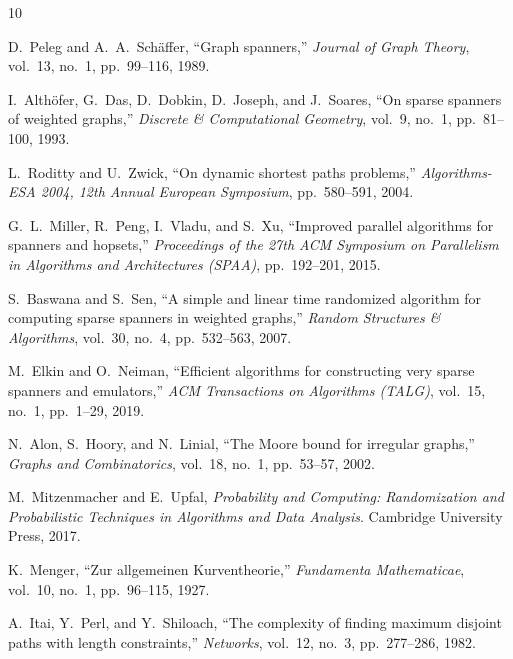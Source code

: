 \documentclass[11pt,a4paper]{report}
\theoremstyle{plain}
\theoremstyle{definition}
\theoremstyle{remark}
\begin{document}
\begin{thebibliography}{10}
\baselineskip=6mm
\begin{LTRbibitems}
\resetlatinfont

D.~Peleg and A.~A.~Schäffer, ``Graph spanners,'' \emph{Journal of Graph Theory}, vol.~13, no.~1, pp.~99--116, 1989.

I.~Althöfer, G.~Das, D.~Dobkin, D.~Joseph, and J.~Soares, ``On sparse spanners of weighted graphs,'' \emph{Discrete \& Computational Geometry}, vol.~9, no.~1, pp.~81--100, 1993.

L.~Roditty and U.~Zwick, ``On dynamic shortest paths problems,'' \emph{Algorithms-ESA 2004, 12th Annual European Symposium}, pp.~580--591, 2004.

G.~L.~Miller, R.~Peng, I.~Vladu, and S.~Xu, ``Improved parallel algorithms for spanners and hopsets,'' \emph{Proceedings of the 27th ACM Symposium on Parallelism in Algorithms and Architectures (SPAA)}, pp.~192--201, 2015.

S.~Baswana and S.~Sen, ``A simple and linear time randomized algorithm for computing sparse spanners in weighted graphs,'' \emph{Random Structures \& Algorithms}, vol.~30, no.~4, pp.~532--563, 2007.

M.~Elkin and O.~Neiman, ``Efficient algorithms for constructing very sparse spanners and emulators,'' \emph{ACM Transactions on Algorithms (TALG)}, vol.~15, no.~1, pp.~1--29, 2019.

N.~Alon, S.~Hoory, and N.~Linial, ``The Moore bound for irregular graphs,'' \emph{Graphs and Combinatorics}, vol.~18, no.~1, pp.~53--57, 2002.

M.~Mitzenmacher and E.~Upfal, \emph{Probability and Computing: Randomization and Probabilistic Techniques in Algorithms and Data Analysis}. Cambridge University Press, 2017.

K.~Menger, ``Zur allgemeinen Kurventheorie,'' \emph{Fundamenta Mathematicae}, vol.~10, no.~1, pp.~96--115, 1927.

A.~Itai, Y.~Perl, and Y.~Shiloach, ``The complexity of finding maximum disjoint paths with length constraints,'' \emph{Networks}, vol.~12, no.~3, pp.~277--286, 1982.

\end{LTRbibitems}
\end{thebibliography}
\end{document}
